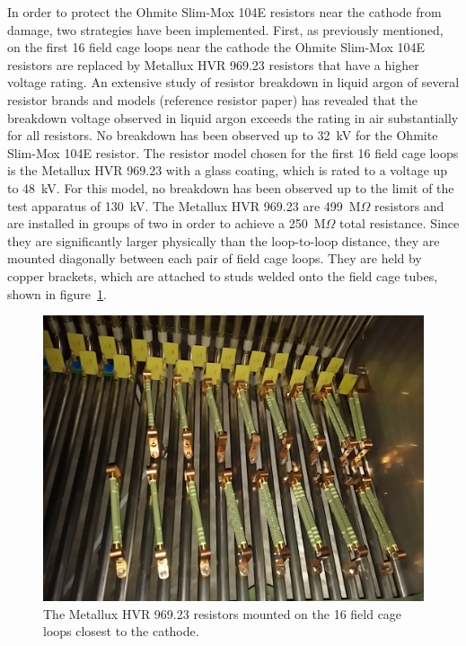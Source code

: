 In order to protect the Ohmite Slim-Mox 104E resistors near the cathode from damage, two strategies have been implemented.  First, as previously mentioned, on the first 16 field cage loops near the cathode the Ohmite Slim-Mox 104E resistors are replaced by Metallux HVR 969.23 resistors that have a higher voltage rating. An extensive study of resistor breakdown in liquid argon of several resistor brands and models (reference resistor paper) has revealed that the breakdown voltage observed in liquid argon exceeds the rating in air substantially for all resistors. No breakdown has been observed up to 32~kV for the Ohmite Slim-Mox 104E resistor. The resistor model chosen for the first 16 field cage loops is the Metallux HVR 969.23 with a glass coating, which is rated to a voltage up to 48~kV. For this model, no breakdown has been observed up to the limit of the test apparatus of 130~kV. The Metallux HVR 969.23 are 499~M$\Omega$ resistors and are installed in groups of two in order to achieve a 250~M$\Omega$ total resistance. Since they are significantly larger physically than the loop-to-loop distance, they are mounted diagonally between each pair of field cage loops. They are held by copper brackets, which are attached to studs welded onto the field cage tubes, shown in figure~\ref{fig:tpc-voltage-divider-metallux}.

\begin{figure}[htb]
\centering	
\includegraphics[width=0.8\linewidth]{figures/tpc-voltage-divider-metallux.jpg}
\caption{The Metallux HVR 969.23 resistors mounted on the 16 field cage loops closest to the cathode.}
\label{fig:tpc-voltage-divider-metallux}
\end{figure}


